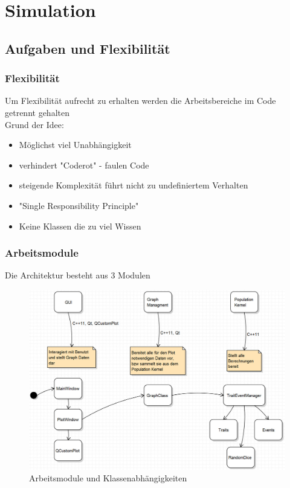\documentclass{beamer}
\begin{document}
\section{Simulation}
	\subsection{Aufgaben und Flexibilität}
		\begin{frame}
			\frametitle{Flexibilität}
			Um Flexibilität aufrecht zu erhalten werden die Arbeitsbereiche im Code getrennt gehalten\\
			\pause
			Grund der Idee:
			\begin{itemize}
				\item Möglichst viel Unabhängigkeit
				\pause
				\item verhindert "{}Coderot"{} - faulen Code
				\pause
				\item steigende Komplexität führt nicht zu undefiniertem Verhalten
				\pause
				\item "{}Single Responsibility Principle"{}
				\pause
				\item Keine Klassen die zu viel Wissen
			\end{itemize}
		\end{frame}
		\begin{frame}
			\frametitle{Arbeitsmodule}
			Die Architektur besteht aus 3 Modulen
			\pause
			\begin{figure}[H]
				\centering
				\includegraphics[width=0.8\linewidth]{./Bild_Module}
				\caption[Module]{Arbeitsmodule und Klassenabhängigkeiten}
				\label{Module und Klassen}
			\end{figure}
		\end{frame}
\end{document}
